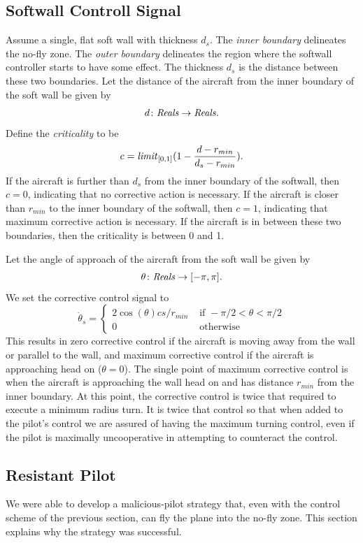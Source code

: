 \documentclass[11pt]{article}
\begin{document}
\subsection{Softwall Controll Signal}

Assume a single, flat soft wall with thickness $d_s$.
The \textit{inner boundary} delineates the no-fly zone.
The \textit{outer boundary} delineates the region where the
softwall controller starts to have some effect.
The thickness $d_s$ is the distance between these two boundaries.
Let the distance of the aircraft from the inner boundary of
the soft wall be given by
\[
d \colon \mbox{\textit{Reals}} \to \mbox{\textit{Reals}} .
\]
Define the \textit{criticality} to be
\[
c = \mbox{\textit{limit}}_{[0,1]}(1 - {{d - r_{min}}\over{d_s - r_{min}}}) .
\]
If the aircraft is further than $d_s$ from the inner boundary of the
softwall, then $c = 0$, indicating that no corrective action is necessary.
If the aircraft is closer than $r_{min}$ to the inner boundary of the softwall,
then $c = 1$, indicating that maximum corrective action is necessary.
If the aircraft is in between these two boundaries, then the criticality
is between 0 and 1.

Let the angle of approach of the aircraft from the soft wall be given by
\[
\theta \colon \mbox{\textit{Reals}} \to [-\pi, \pi].
\]
We set the corrective control signal to
\[
\dot{\theta}_s = \left \{
\begin{array}{ll}
2 \cos(\theta) c s/r_{min}& \mbox{ if } -\pi / 2 < \theta < \pi / 2 \\
0 & \mbox{ otherwise}
\end{array}
\right .
\]
This results in zero corrective control if the aircraft is moving
away from the wall or parallel to the wall, and maximum corrective
control if the aircraft is approaching head on ($\theta = 0$).  
The single point
of maximum corrective control is when the aircraft is approaching
the wall head on and has distance $r_{min}$ from the inner boundary.
At this point, the corrective control is twice that required to
execute a minimum radius turn.  It is twice that control so that
when added to the pilot's control we are assured of having
the maximum turning control, even if the pilot is maximally
uncooperative in attempting to counteract the control.

\subsection{Resistant Pilot}

We were able to develop a malicious-pilot strategy that, even with the
control scheme of the previous section, can fly the plane into the no-fly zone.
This section explains why the strategy was successful.
\end{document}
